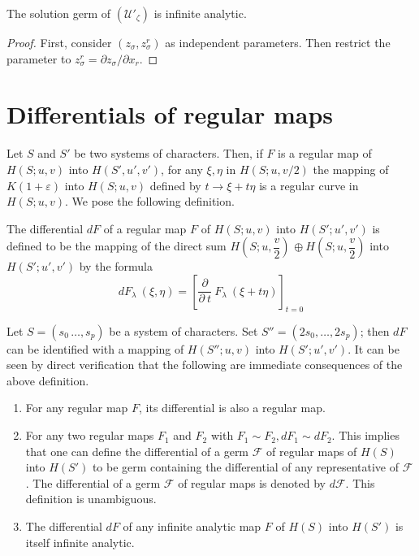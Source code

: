 \begin{theorem}\label{chap1:sec1.9:thm6}%
  The solution germ of $(\mathscr{U}'_\zeta)$ is infinite analytic.
\end{theorem}

\begin{proof}%
  First,  consider $(z_\sigma,  z^r_\sigma)$ as independent
  parameters. Then restrict the parameter to $z^r_\sigma = \partial
  z_\sigma/ \partial x_r$. 
\end{proof}

\section{Differentials of regular maps}\label{chap1:sec1.10} %

Let $S$ and $S'$ be two systems of characters. Then,  if $F$ is a
regular map of $H(S; u,  v)$ into $H(S',  u',  v')$,  for any $\xi,
\eta$ in $H(S; u,  v/2)$ the mapping of $K(1+ \varepsilon)$ into
$H(S;u,  v)$ defined by $t \rightarrow \xi + t \eta$ is a regular
curve in $H(S; u, v)$. We pose the following definition.\pageoriginale 

\begin{defi*}%
  The differential $dF$ of a regular map $F$ of $H(S; u,  v) $ into
  $H(S';  u',  v')$ is defined to be the mapping of the direct sum
  $H\left(S; u,  \dfrac{v}{2}\right)$ $\oplus~ H \left(S; u,
  \dfrac{v}{2}\right)$ into $H(S';
  u',  v')$ by the formula 
  $$
  dF_\lambda ~ (\xi,  \eta) = \left[  \frac{\partial}{\partial ~ t} ~
    F_\lambda ~ ( \xi + t \eta)\right]_{t=0} 
  $$
\end{defi*}

\begin{remarks*}%
  Let $S = (s_0 \,  \ldots,  s_p)$ be a system of characters. Set $S''
  = (2s_0,  \ldots,  2s_p)$; then $dF$ can be identified with a
  mapping of $H(S''; u, v)$ into $H(S'; u',  v')$. It can be seen by
  direct verification that the following are immediate consequences of
  the above definition. 
  \begin{enumerate}[\rm (1)]
  \item For any regular map $F$,  its differential is also a regular map.
  \item For any two regular maps $F_1$ and $F_2$ with $F_1 \sim F_2,
    dF_1 \sim dF_2$. This implies that one can define the differential
    of a germ $\mathscr{F}$ of regular maps of $H(S)$ into $H(S')$ to be
    germ containing the differential of any representative of
    $\mathscr{F}$. The differential of a germ $\mathscr{F}$ of regular
    maps is denoted by $d \mathscr{F}$. This definition is
    unambiguous. 
  \item The differential $dF$ of any infinite analytic map $F$ of $H(S)$
    into $H(S')$ is itself infinite analytic. 
  \end{enumerate}
\end{remarks*}

